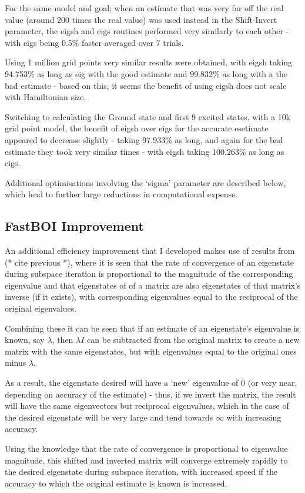 For the same model and goal; when an estimate that was very far off the real value (around 200 times the real value) was used instead in the Shift-Invert parameter, the eigsh and eigs routines performed very similarly to each other - with eigs being 0.5\% faster averaged over 7 trials.

Using 1 million grid points very similar results were obtained, with eigsh taking 94.753\% as long as eig with the good estimate and 99.832\% as long with a the bad estimate - based on this, it seems the benefit of using eigsh does not scale with Hamiltonian size.

Switching to calculating the Ground state and first 9 excited states, with a 10k grid point model, the benefit of eigsh over eigs for the accurate esetimate appeared to decrease slightly - taking 97.933\% as long, and again for the bad estimate they took very similar times - with eigsh taking 100.263\% as long as eigs.

Additional optimisations involving the `sigma' parameter are described below, which lead to further large reductions in computational expense.

\subsection{FastBOI Improvement}
An additional efficiency improvement that I developed makes use of results from (* cite previous *), where it is seen that the rate of convergence of an eigenstate during subspace iteration is proportional to the magnitude of the corresponding eigenvalue and that eigenstates of of a matrix are also eigenstates of that matrix's inverse (if it exists), with corresponding eigenvalues equal to the reciprocal of the original eigenvalues. 

Combining these it can be seen that if an estimate of an eigenstate's eigenvalue is known, say $\lambda$, then $\lambda I$ can be subtracted from the original matrix to create a new matrix with the same eigenstates, but with eigenvalues equal to the original ones minus $\lambda$. 

As a result, the eigenstate desired will have a `new' eigenvalue of $0$ (or very near, depending on accuracy of the estimate) - thus, if we invert the matrix, the result will have the same eigenvectors but reciprocal eigenvalues, which in the case of the desired eigenstate will be very large and tend towards $\infty$ with increasing accuracy. 

Using the knowledge that the rate of convergence is proportional to eigenvalue magnitude, this shifted and inverted matrix will converge extremely rapidly to the desired eigenstate during subspace iteration, with increased speed if the accuracy to which the original estimate is known is increased.

